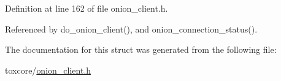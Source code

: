 Definition at line 162 of file onion\+\_\+client.\+h.



Referenced by do\+\_\+onion\+\_\+client(), and onion\+\_\+connection\+\_\+status().



The documentation for this struct was generated from the following file\+:\begin{DoxyCompactItemize}
\item 
toxcore/\hyperlink{onion__client_8h}{onion\+\_\+client.\+h}\end{DoxyCompactItemize}
